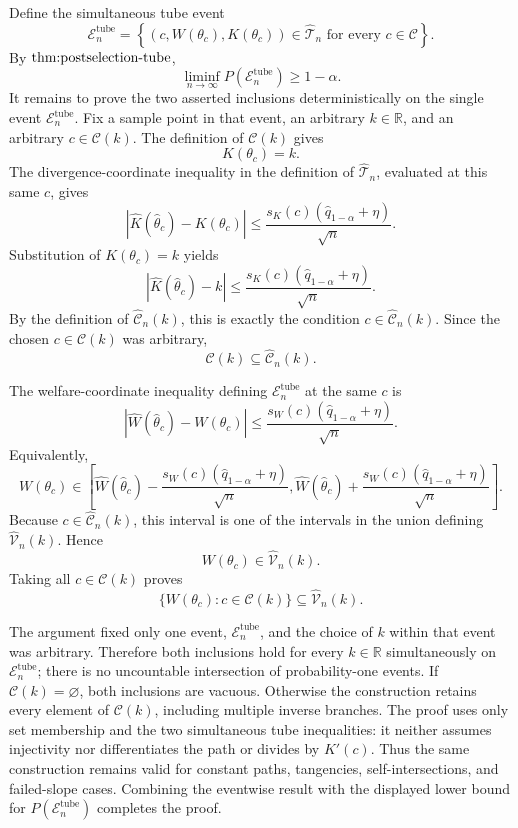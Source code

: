 Define the simultaneous tube event
\[
 \mathcal E_n^{\mathrm{tube}}
 =\left\{(c,W(\theta_c),K(\theta_c))\in\widehat{\mathcal T}_n
          \text{ for every }c\in\mathcal C\right\}.
\]
By \(\textnormal{thm:postselection-tube}\),
\[
 \liminf_{n\to\infty}P(\mathcal E_n^{\mathrm{tube}})\ge 1-\alpha.
\]
It remains to prove the two asserted inclusions deterministically on the single
event \(\mathcal E_n^{\mathrm{tube}}\).  Fix a sample point in that event, an
arbitrary \(k\in\mathbb R\), and an arbitrary \(c\in\mathcal C(k)\).  The
definition of \(\mathcal C(k)\) gives
\[
 K(\theta_c)=k.
\]
The divergence-coordinate inequality in the definition of
\(\widehat{\mathcal T}_n\), evaluated at this same \(c\), gives
\[
 \left|\widehat K(\widehat\theta_c)-K(\theta_c)\right|
 \le
 \frac{s_K(c)(\widehat q_{1-\alpha}+\eta)}{\sqrt n}.
\]
Substitution of \(K(\theta_c)=k\) yields
\[
 \left|\widehat K(\widehat\theta_c)-k\right|
 \le
 \frac{s_K(c)(\widehat q_{1-\alpha}+\eta)}{\sqrt n}.
\]
By the definition of \(\widehat{\mathcal C}_n(k)\), this is exactly the
condition \(c\in\widehat{\mathcal C}_n(k)\).  Since the chosen
\(c\in\mathcal C(k)\) was arbitrary,
\[
 \mathcal C(k)\subseteq\widehat{\mathcal C}_n(k).
\]

The welfare-coordinate inequality defining \(\mathcal E_n^{\mathrm{tube}}\)
at the same \(c\) is
\[
 \left|\widehat W(\widehat\theta_c)-W(\theta_c)\right|
 \le
 \frac{s_W(c)(\widehat q_{1-\alpha}+\eta)}{\sqrt n}.
\]
Equivalently,
\[
 W(\theta_c)\in
 \left[
 \widehat W(\widehat\theta_c)
   -\frac{s_W(c)(\widehat q_{1-\alpha}+\eta)}{\sqrt n},
 \widehat W(\widehat\theta_c)
   +\frac{s_W(c)(\widehat q_{1-\alpha}+\eta)}{\sqrt n}
 \right].
\]
Because \(c\in\widehat{\mathcal C}_n(k)\), this interval is one of the
intervals in the union defining \(\widehat{\mathcal V}_n(k)\).  Hence
\[
 W(\theta_c)\in\widehat{\mathcal V}_n(k).
\]
Taking all \(c\in\mathcal C(k)\) proves
\[
 \{W(\theta_c):c\in\mathcal C(k)\}
 \subseteq\widehat{\mathcal V}_n(k).
\]

The argument fixed only one event, \(\mathcal E_n^{\mathrm{tube}}\), and the
choice of \(k\) within that event was arbitrary.  Therefore both inclusions
hold for every \(k\in\mathbb R\) simultaneously on
\(\mathcal E_n^{\mathrm{tube}}\); there is no uncountable intersection of
probability-one events.  If \(\mathcal C(k)=\varnothing\), both inclusions are
vacuous.  Otherwise the construction retains every element of
\(\mathcal C(k)\), including multiple inverse branches.  The proof uses only
set membership and the two simultaneous tube inequalities: it neither assumes
injectivity nor differentiates the path or divides by \(K'(c)\).  Thus the
same construction remains valid for constant paths, tangencies,
self-intersections, and failed-slope cases.  Combining the eventwise result
with the displayed lower bound for \(P(\mathcal E_n^{\mathrm{tube}})\)
completes the proof.
